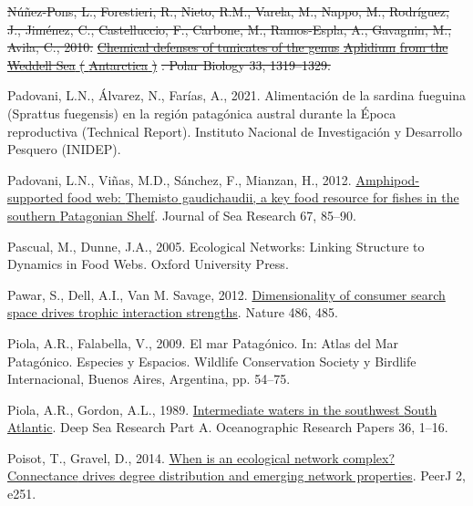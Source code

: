 \documentclass[
]{article}
\newlength{\cslhangindent}
\newenvironment{CSLReferences}[2] %
 {\begin{list}{}{%
  \setlength{\itemindent}{0pt}
  \setlength{\leftmargin}{0pt}
  \setlength{\parsep}{0pt}
  \ifodd #1
   \setlength{\leftmargin}{\cslhangindent}
   \setlength{\itemindent}{-1\cslhangindent}
  \fi
  \setlength{\itemsep}{#2\baselineskip}}}
 {\end{list}}
\providecommand{\DIFdel}[1]{{\protect\color{red}\sout{#1}}}                      %
\providecommand{\DIFdelbegin}{} %
\providecommand{\DIFdelend}{} %
\newcommand{\DIFscaledelfig}{0.5}
\newlength{\DIFdelgraphicswidth} %
\newlength{\DIFdelgraphicsheight} %
\newcommand{\DIFdelincludegraphics}[2][]{%
\sbox{\DIFdelgraphicsbox}{\DIFOincludegraphics[#1]{#2}}%
\settoboxwidth{\DIFdelgraphicswidth}{\DIFdelgraphicsbox} %
\settoboxtotalheight{\DIFdelgraphicsheight}{\DIFdelgraphicsbox} %
\scalebox{\DIFscaledelfig}{%
\parbox[b]{\DIFdelgraphicswidth}{\usebox{\DIFdelgraphicsbox}\\[-\baselineskip] \rule{\DIFdelgraphicswidth}{0em}}\llap{\resizebox{\DIFdelgraphicswidth}{\DIFdelgraphicsheight}{%
\setlength{\unitlength}{\DIFdelgraphicswidth}%
\begin{picture}(1,1)%
\thicklines\linethickness{2pt} %
{\color[rgb]{1,0,0}\put(0,0){\framebox(1,1){}}}%
{\color[rgb]{1,0,0}\put(0,0){\line( 1,1){1}}}%
{\color[rgb]{1,0,0}\put(0,1){\line(1,-1){1}}}%
\end{picture}%
}\hspace*{3pt}}} %
} %
\DeclareRobustCommand{\DIFdelbegin}{\DIFOdelbegin \let\includegraphics\DIFdelincludegraphics} %
\DeclareRobustCommand{\DIFdelend}{\DIFOaddend \let\includegraphics\DIFOincludegraphics} %
\begin{document}
\begin{CSLReferences}{1}{0}
\DIFdelbegin {}
\DIFdel{Núñez-Pons, L., Forestieri, R., Nieto, R.M., Varela, M., Nappo, M.,
Rodríguez, J., Jiménez, C., Castelluccio, F., Carbone, M., Ramos-Espla,
A., Gavagnin, M., Avila, C., 2010.
}\href{https://doi.org/10.1007/s00300-010-0819-7}{\DIFdel{Chemical defenses of
tunicates of the genus }%
\DIFdel{Aplidium}%
\DIFdel{from the }%
\DIFdel{Weddell Sea}%
\DIFdel{(}%
\DIFdel{Antarctica}%
\DIFdel{)}}%
\DIFdel{. Polar Biology 33, 1319--1329.
}%

\DIFdelend {}
Padovani, L.N., Álvarez, N., Farías, A., 2021. Alimentaci{ó}n de la
sardina fueguina ({Sprattus} fuegensis) en la regi{ó}n patag{ó}nica
austral durante la {É}poca reproductiva (Technical Report). {Instituto
Nacional de Investigaci{ó}n y Desarrollo Pesquero (INIDEP)}.

Padovani, L.N., Viñas, M.D., Sánchez, F., Mianzan, H., 2012.
\href{https://doi.org/10.1016/j.seares.2011.10.007}{Amphipod-supported
food web: {Themisto} gaudichaudii, a key food resource for fishes in the
southern {Patagonian Shelf}}. Journal of Sea Research 67, 85--90.

Pascual, M., Dunne, J.A., 2005. Ecological {Networks}: {Linking
Structure} to {Dynamics} in {Food Webs}. {Oxford University Press}.

Pawar, S., Dell, A.I., Van M. Savage, 2012.
\href{https://doi.org/10.1038/nature11131}{Dimensionality of consumer
search space drives trophic interaction strengths}. Nature 486, 485.

Piola, A.R., Falabella, V., 2009. {El mar Patag{ó}nico}. In: {Atlas del
Mar Patag{ó}nico. Especies y Espacios}. {Wildlife Conservation Society y
Birdlife Internacional}, {Buenos Aires, Argentina}, pp. 54--75.

Piola, A.R., Gordon, A.L., 1989.
\href{https://doi.org/10.1016/0198-0149(89)90015-0}{Intermediate waters
in the southwest {South Atlantic}}. Deep Sea Research Part A.
Oceanographic Research Papers 36, 1--16.

Poisot, T., Gravel, D., 2014.
\href{https://doi.org/10.7717/peerj.251}{When is an ecological network
complex? {Connectance} drives degree distribution and emerging network
properties}. PeerJ 2, e251.


\end{CSLReferences}
\end{document}
